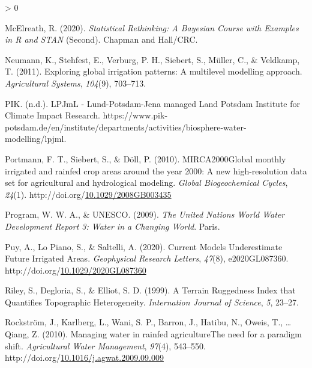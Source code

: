 \documentclass[12pt,twoside]{reedthesis}
\newlength{\cslhangindent}
\newenvironment{CSLReferences}[2] %
 {%
  \setlength{\parindent}{0pt}
  \ifodd #1 \everypar{\setlength{\hangindent}{\cslhangindent}}\ignorespaces\fi
  \ifnum #2 > 0
  \setlength{\parskip}{#2\baselineskip}
  \fi
 }%
 {}
\begin{document}
\begin{CSLReferences}{1}{0}
\leavevmode\hypertarget{ref-mcelreathStatisticalRethinkingBayesian2020}{}%
McElreath, R. (2020). \emph{Statistical {Rethinking}: A {Bayesian Course} with {Examples} in {R} and {STAN}} (Second). {Chapman and Hall/CRC}.

\leavevmode\hypertarget{ref-neumannExploringGlobalIrrigation2011}{}%
Neumann, K., Stehfest, E., Verburg, P. H., Siebert, S., Müller, C., \& Veldkamp, T. (2011). Exploring global irrigation patterns: A multilevel modelling approach. \emph{Agricultural Systems}, \emph{104}(9), 703--713.

\leavevmode\hypertarget{ref-pikLPJmLLundPotsdamJenaManaged}{}%
PIK. (n.d.). {LPJmL} - {Lund}-{Potsdam}-{Jena} managed {Land} {} {Potsdam Institute} for {Climate Impact Research}. https://www.pik-potsdam.de/en/institute/departments/activities/biosphere-water-modelling/lpjml.

\leavevmode\hypertarget{ref-portmannMIRCA2000GlobalMonthly2010a}{}%
Portmann, F. T., Siebert, S., \& Döll, P. (2010). {MIRCA2000}{{Global}} monthly irrigated and rainfed crop areas around the year 2000: A new high-resolution data set for agricultural and hydrological modeling. \emph{Global Biogeochemical Cycles}, \emph{24}(1). http://doi.org/\href{https://doi.org/10.1029/2008GB003435}{10.1029/2008GB003435}

\leavevmode\hypertarget{ref-worldwaterassesnentprogramUnitedNationsWorld2009}{}%
Program, W. W. A., \& UNESCO. (2009). \emph{The {United Nations World Water Development Report} 3: Water in a {Changing World}}. {Paris}.

\leavevmode\hypertarget{ref-puyCurrentModelsUnderestimate2020}{}%
Puy, A., Lo Piano, S., \& Saltelli, A. (2020). Current {Models Underestimate Future Irrigated Areas}. \emph{Geophysical Research Letters}, \emph{47}(8), e2020GL087360. http://doi.org/\href{https://doi.org/10.1029/2020GL087360}{10.1029/2020GL087360}

\leavevmode\hypertarget{ref-rileyTerrainRuggednessIndex1999}{}%
Riley, S., Degloria, S., \& Elliot, S. D. (1999). A {Terrain Ruggedness Index} that {Quantifies Topographic Heterogeneity}. \emph{Internation Journal of Science}, \emph{5}, 23--27.

\leavevmode\hypertarget{ref-rockstromManagingWaterRainfed2010}{}%
Rockström, J., Karlberg, L., Wani, S. P., Barron, J., Hatibu, N., Oweis, T., \ldots{} Qiang, Z. (2010). Managing water in rainfed agriculture{{The}} need for a paradigm shift. \emph{Agricultural Water Management}, \emph{97}(4), 543--550. http://doi.org/\href{https://doi.org/10.1016/j.agwat.2009.09.009}{10.1016/j.agwat.2009.09.009}


\end{CSLReferences}
\end{document}
